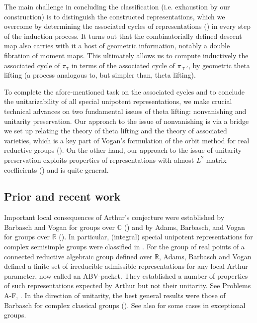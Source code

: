\documentclass[11pt,a4paper]{amsart}
\newcommand{\BC}{{\mathbb {C}}}
\newcommand{\BR}{{\mathbb {R}}}
\numberwithin{equation}{section}
\theoremstyle{remark}
\begin{document}
The main challenge in concluding the classification (i.e. exhaustion by our construction) is to distinguish the constructed representations, which we overcome by determining the associated cycles of representations (\cite{Vo89}) in every step of the induction process. It turns out that the combinatorially defined descent map also carries with it a host of geometric information, notably a double fibration of moment maps. This ultimately allows us to compute inductively the associated cycle of $\pi_{\uptau}$ in terms of the associated cycle of $\pi_{\uptau'}$, by geometric theta lifting (a process analogous to, but simpler than, theta lifting). 

To complete the afore-mentioned task on the associated cycles and to conclude the unitarizability of all special unipotent representations, we make crucial technical advances  on two fundamental issues of theta lifting: nonvanishing and unitarity preservation. Our approach to the issue of nonvanishing is via a  bridge we set up relating the theory of theta lifting and the theory of associated varieties, which is a key part of Vogan’s formulation of the orbit method for real reductive groups (\cite{VoBook,Vo98}). On the other hand, our approach to the issue of unitarity preservation exploits properties of representations with almost $L^2$ matrix coefficients (\cite{CHH}) and is quite general.  


\subsection{Prior and recent work}

Important local consequences of Arthur's conjecture were established by Barbasch and Vogan for groups over $\BC$ (\cite{BVUni}) and by Adams, Barbasch, and Vogan for groups over $\BR$ (\cite{ABV}). In particular, (integral) special unipotent representations for complex semisimple groups were classified in \cite{BVUni}. For the group of real points of a connected reductive algebraic group defined over $\BR$, Adams, Barbasch and Vogan defined a finite set of irreducible admissible representations for any local Arthur parameter, now called an ABV-packet. They established a number of properties of such representations expected by Arthur but not their unitarity. See Problems A-F, \cite{ABV}. In the direction of unitarity, the best general results were those of Barbasch for complex classical groups (\cite{B.Class}). See also \cite{Mil} for some cases in exceptional groups. 
\end{document}
